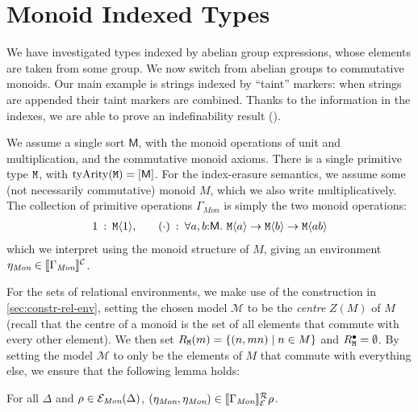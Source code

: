 \section{Monoid Indexed Types}
\label{sec:monoid-indexed-types}

\newcommand{\Mon}{\textit{Mon}}

We have investigated types indexed by abelian group expressions, whose
elements are taken from some group. We now switch from abelian groups
to commutative monoids.  Our main example is strings indexed by
``taint'' markers: when strings are appended their taint markers are
combined. Thanks to the information in the indexes, we are able to
prove an indefinability result ().

We assume a single sort $\mathsf{M}$, with the monoid operations of
unit and multiplication, and the commutative monoid axioms. There is a
single primitive type $\texttt{M}$, with $\mathrm{tyArity}(\texttt{M})
= [\mathsf{M}]$. For the index-erasure semantics, we assume some (not
necessarily commutative) monoid $M$, which we also write
multiplicatively. The collection of primitive operations
$\Gamma_{\mathit{Mon}}$ is simply the two monoid operations:
\begin{displaymath}
  \begin{array}{r@{\hspace{0.5em}:\hspace{0.5em}}l@{\hspace{2em}}r@{\hspace{0.5em}:\hspace{0.5em}}l}
    1 & \tyPrim{M}{1}, &
    (\cdot) & \forall a,b\mathord:\mathsf{M}.\ \tyPrim{M}{a} \to \tyPrim{M}{b} \to \tyPrim{M}{a b}
  \end{array}
\end{displaymath}
which we interpret using the monoid structure of $M$, giving an
environment $\eta_\Mon \in \ctxtSem{\Gamma_\Mon}$.

For the sets of relational environments, we make use of the
construction in \autoref{sec:constr-rel-env}, setting the chosen model
$\mathcal{M}$ to be the \emph{centre} $Z(M)$ of $M$ (recall that the
centre of a monoid is the set of all elements that commute with every
other element). We then set $R_{\texttt{M}}(m) = \{ (n,mn) \mathrel| n
\in M \}$ and $R^\bullet_{\texttt{M}} = \emptyset$. By setting the
model $\mathcal{M}$ to only be the elements of $M$ that commute with
everything else, we ensure that the following lemma holds:
\begin{lemma}
  For all $\Delta$ and $\rho \in \relEnv{E}_\Mon(\Delta)$,
  $(\eta_\Mon,\eta_\Mon) \in \rsem{\Gamma_\Mon}{\relEnv{E}}\rho$.
\end{lemma}

